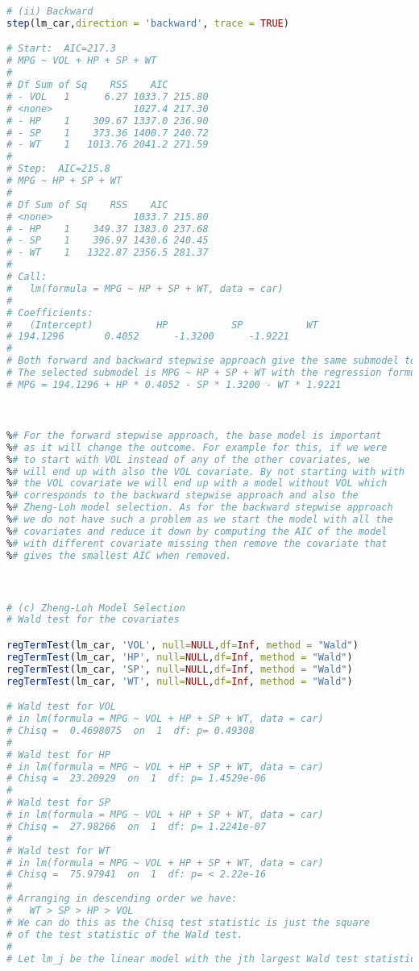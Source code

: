 \documentclass[a4paper,10pt]{article}
\theoremstyle{definition}
\begin{document}
\begin{enumerate}
\begin{lstlisting}[language=R,commentstyle=\fontseries{lc}\color{gray}]
# (ii) Backward
step(lm_car,direction = 'backward', trace = TRUE)

# Start:  AIC=217.3
# MPG ~ VOL + HP + SP + WT
# 
# Df Sum of Sq    RSS    AIC
# - VOL   1      6.27 1033.7 215.80
# <none>              1027.4 217.30
# - HP    1    309.67 1337.0 236.90
# - SP    1    373.36 1400.7 240.72
# - WT    1   1013.76 2041.2 271.59
# 
# Step:  AIC=215.8
# MPG ~ HP + SP + WT
# 
# Df Sum of Sq    RSS    AIC
# <none>              1033.7 215.80
# - HP    1    349.37 1383.0 237.68
# - SP    1    396.97 1430.6 240.45
# - WT    1   1322.87 2356.5 281.37
# 
# Call:
#   lm(formula = MPG ~ HP + SP + WT, data = car)
# 
# Coefficients:
#   (Intercept)           HP           SP           WT  
# 194.1296       0.4052      -1.3200      -1.9221  
# 
# Both forward and backward stepwise approach give the same submodel to be selected.
# The selected submodel is MPG ~ HP + SP + WT with the regression formula:
# MPG = 194.1296 + HP * 0.4052 - SP * 1.3200 - WT * 1.9221 


 
%# For the forward stepwise approach, the base model is important
%# as it will change the outcome. For example for this, if we were
%# to start with VOL instead of any of the other covariates, we 
%# will end up with also the VOL covariate. By not starting with with
%# the VOL covariate we will end up with a model without VOL which 
%# corresponds to the backward stepwise approach and also the 
%# Zheng-Loh model selection. As for the backward stepwise approach
%# we do not have such a problem as we start the model with all the 
%# covariates and reduce it down by computing the AIC of the model
%# with different covariate missing then remove the covariate that 
%# gives the smallest AIC when removed.



# (c) Zheng-Loh Model Selection
# Wald test for the covariates

regTermTest(lm_car, 'VOL', null=NULL,df=Inf, method = "Wald")
regTermTest(lm_car, 'HP', null=NULL,df=Inf, method = "Wald")
regTermTest(lm_car, 'SP', null=NULL,df=Inf, method = "Wald")
regTermTest(lm_car, 'WT', null=NULL,df=Inf, method = "Wald")

# Wald test for VOL
# in lm(formula = MPG ~ VOL + HP + SP + WT, data = car)
# Chisq =  0.4698075  on  1  df: p= 0.49308 
# 
# Wald test for HP
# in lm(formula = MPG ~ VOL + HP + SP + WT, data = car)
# Chisq =  23.20929  on  1  df: p= 1.4529e-06 
# 
# Wald test for SP
# in lm(formula = MPG ~ VOL + HP + SP + WT, data = car)
# Chisq =  27.98266  on  1  df: p= 1.2241e-07 
# 
# Wald test for WT
# in lm(formula = MPG ~ VOL + HP + SP + WT, data = car)
# Chisq =  75.97941  on  1  df: p= < 2.22e-16
# 
# Arranging in descending order we have:
#   WT > SP > HP > VOL
# We can do this as the Chisq test statistic is just the square 
# of the test statistic of the Wald test.
# 
# Let lm_j be the linear model with the jth largest Wald test statistic


\end{lstlisting}
\end{enumerate}
\end{document}
